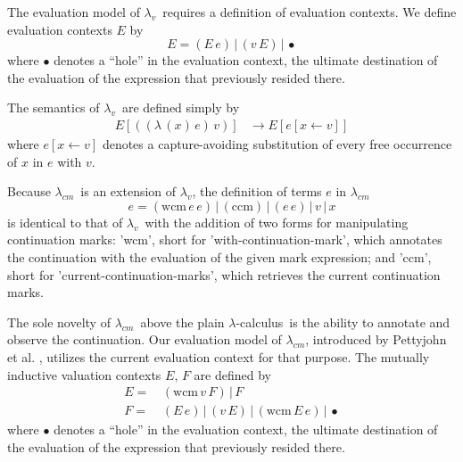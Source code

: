 \documentclass{llncs}
\newcommand{\cm}[0]{$\lambda_{cm}$}
\newcommand{\lv}[0]{$\lambda_v$}
\newcommand{\lc}[0]{$\lambda$-calculus}
\newcommand{\wcm}[2]{(\mathrm{wcm}\,#1\,#2)}
\newcommand{\ccm}[0]{(\mathrm{ccm})}
\newcommand{\app}[2]{(#1\,#2)}
\newcommand{\abs}[2]{(\lambda\,(#1)\,#2)}
\newcommand{\hole}[0]{\bullet}
\newcommand{\rr}[0]{\rightarrow}
\begin{document}
The evaluation model of \lv\ requires a definition of evaluation contexts. We define evaluation contexts $E$ by
\begin{equation}
E=\app{E}{e}\,|\,\app{v}{E}\,|\,\hole
\end{equation}
where $\hole$ denotes a ``hole'' in the evaluation context, the ultimate destination of the evaluation of the expression that previously resided there.

The semantics of \lv\ are defined simply by
\begin{align}
E[\app{\abs{x}{e}}{v}]  &\rr E[e[x\leftarrow v]]
\end{align}
where $e[x\leftarrow v]$ denotes a capture-avoiding substitution of every free occurrence of $x$ in $e$ with $v$.

Because \cm\ is an extension of \lv, the definition of terms $e$ in \cm\ 
\begin{equation}
e=\wcm{e}{e}\,|\,\ccm\,|\,\app{e}{e}\,|\,v\,|\,x
\end{equation}
is identical to that of \lv\ with the addition of two forms for manipulating continuation marks: \scheme'wcm', short for \scheme'with-continuation-mark', which annotates the continuation with the evaluation of the given mark expression; and \scheme'ccm', short for \scheme'current-continuation-marks', which retrieves the current continuation marks.

The sole novelty of \cm\ above the plain \lc\ is the ability to annotate and observe the continuation. Our evaluation model of \cm, introduced by Pettyjohn et al. \cite{pettyjohn2005continuations}, utilizes the current evaluation context for that purpose. The mutually inductive valuation contexts $E$, $F$ are defined by
\begin{align}
E=\, &\wcm{v}{F}\,|\,F\\
F=\, &\app{E}{e}\,|\,\app{v}{E}\,|\,\wcm{E}{e}\,|\,\hole
\end{align}
where $\hole$ denotes a ``hole'' in the evaluation context, the ultimate destination of the evaluation of the expression that previously resided there.
\end{document}
